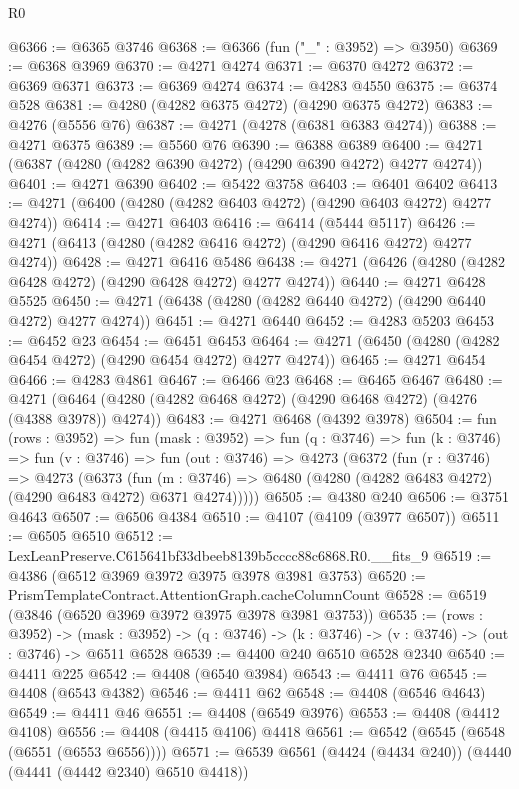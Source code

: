 \begin{lexlean}{R0}
\begin{coremodule}
@6366 := @6365 @3746
@6368 := @6366 (fun ("_" : @3952) => @3950)
@6369 := @6368 @3969
@6370 := @4271 @4274
@6371 := @6370 @4272
@6372 := @6369 @6371
@6373 := @6369 @4274
@6374 := @4283 @4550
@6375 := @6374 @528
@6381 := @4280 (@4282 @6375 @4272) (@4290 @6375 @4272)
@6383 := @4276 (@5556 @76)
@6387 := @4271 (@4278 (@6381 @6383 @4274))
@6388 := @4271 @6375
@6389 := @5560 @76
@6390 := @6388 @6389
@6400 := @4271 (@6387 (@4280 (@4282 @6390 @4272) (@4290 @6390 @4272) @4277 @4274))
@6401 := @4271 @6390
@6402 := @5422 @3758
@6403 := @6401 @6402
@6413 := @4271 (@6400 (@4280 (@4282 @6403 @4272) (@4290 @6403 @4272) @4277 @4274))
@6414 := @4271 @6403
@6416 := @6414 (@5444 @5117)
@6426 := @4271 (@6413 (@4280 (@4282 @6416 @4272) (@4290 @6416 @4272) @4277 @4274))
@6428 := @4271 @6416 @5486
@6438 := @4271 (@6426 (@4280 (@4282 @6428 @4272) (@4290 @6428 @4272) @4277 @4274))
@6440 := @4271 @6428 @5525
@6450 := @4271 (@6438 (@4280 (@4282 @6440 @4272) (@4290 @6440 @4272) @4277 @4274))
@6451 := @4271 @6440
@6452 := @4283 @5203
@6453 := @6452 @23
@6454 := @6451 @6453
@6464 := @4271 (@6450 (@4280 (@4282 @6454 @4272) (@4290 @6454 @4272) @4277 @4274))
@6465 := @4271 @6454
@6466 := @4283 @4861
@6467 := @6466 @23
@6468 := @6465 @6467
@6480 := @4271 (@6464 (@4280 (@4282 @6468 @4272) (@4290 @6468 @4272) (@4276 (@4388 @3978)) @4274))
@6483 := @4271 @6468 (@4392 @3978)
@6504 := fun (rows : @3952) =>
  fun (mask : @3952) =>
  fun (q : @3746) =>
  fun (k : @3746) =>
  fun (v : @3746) =>
  fun (out : @3746) =>
  @4273
    (@6372
      (fun (r : @3746) =>
      @4273
        (@6373
          (fun (m : @3746) => @6480 (@4280 (@4282 @6483 @4272) (@4290 @6483 @4272) @6371 @4274)))))
@6505 := @4380 @240
@6506 := @3751 @4643
@6507 := @6506 @4384
@6510 := @4107 (@4109 (@3977 @6507))
@6511 := @6505 @6510
@6512 := LexLeanPreserve.C615641bf33dbeeb8139b5cccc88c6868.R0.__fits_9
@6519 := @4386 (@6512 @3969 @3972 @3975 @3978 @3981 @3753)
@6520 := PrismTemplateContract.AttentionGraph.cacheColumnCount
@6528 := @6519 (@3846 (@6520 @3969 @3972 @3975 @3978 @3981 @3753))
@6535 := (rows : @3952) ->
  (mask : @3952) -> (q : @3746) -> (k : @3746) -> (v : @3746) -> (out : @3746) -> @6511 @6528
@6539 := @4400 @240 @6510 @6528 @2340
@6540 := @4411 @225
@6542 := @4408 (@6540 @3984)
@6543 := @4411 @76
@6545 := @4408 (@6543 @4382)
@6546 := @4411 @62
@6548 := @4408 (@6546 @4643)
@6549 := @4411 @46
@6551 := @4408 (@6549 @3976)
@6553 := @4408 (@4412 @4108)
@6556 := @4408 (@4415 @4106) @4418
@6561 := @6542 (@6545 (@6548 (@6551 (@6553 @6556))))
@6571 := @6539 @6561 (@4424 (@4434 @240)) (@4440 (@4441 (@4442 @2340) @6510 @4418))

\end{coremodule}
\end{lexlean}
